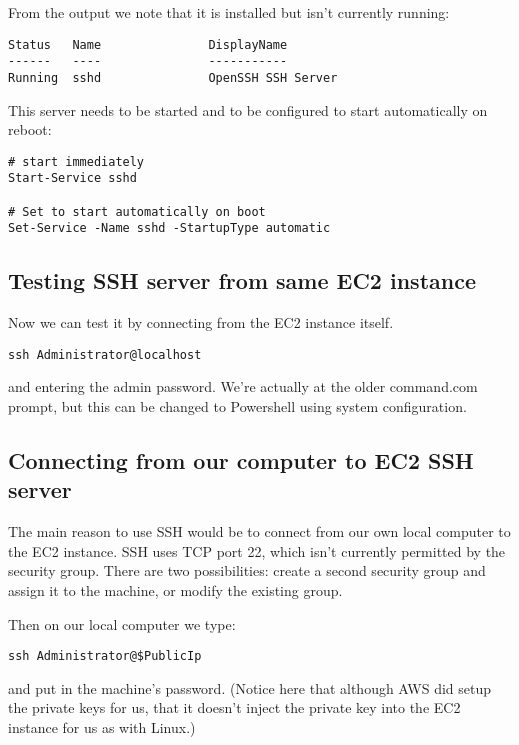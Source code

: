 From the output we note that it is installed but isn't currently
running:

\begin{verbatim}
Status   Name               DisplayName
------   ----               -----------
Running  sshd               OpenSSH SSH Server
\end{verbatim}

This server needs to be started and to be configured to start
automatically on reboot:

\begin{verbatim}
# start immediately
Start-Service sshd

# Set to start automatically on boot
Set-Service -Name sshd -StartupType automatic
\end{verbatim}

\subsection{Testing SSH server from same EC2
instance}\label{testing-ssh-server-from-same-ec2-instance}

Now we can test it by connecting from the EC2 instance itself.

\begin{verbatim}
ssh Administrator@localhost
\end{verbatim}

and entering the admin password. We're actually at the older command.com
prompt, but this can be changed to Powershell using system
configuration.

\subsection{Connecting from our computer to EC2 SSH
server}\label{connecting-from-our-computer-to-ec2-ssh-server}

The main reason to use SSH would be to connect from our own local
computer to the EC2 instance. SSH uses TCP port 22, which isn't
currently permitted by the security group. There are two possibilities:
create a second security group and assign it to the machine, or modify
the existing group.


Then on our local computer we type:

\begin{verbatim}
ssh Administrator@$PublicIp
\end{verbatim}

and put in the machine's password. (Notice here that although AWS did
setup the private keys for us, that it doesn't inject the private key
into the EC2 instance for us as with Linux.)

